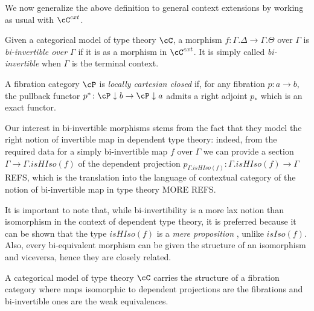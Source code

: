 \documentclass[a4paper,fontsize=12pt]{scrartcl}
\begin{document}
We now generalize the above definition to general context extensions by working
as usual with $\cC^{cxt}$.

\begin{defn}
  Given a categorical model of type theory $\cC$, a morphism
  $f\colon\Gamma.\Delta\rightarrow\Gamma.\Theta$ over $\Gamma$ is
  \emph{bi-invertible over $\Gamma$} if it is as a morphism in $\cC^{cxt}$. It
  is simply called \emph{bi-invertible} when $\Gamma$ is the terminal
  context.
\end{defn}

\begin{defn}
  A fibration category $\cP$ is \emph{locally cartesian closed} if, for any
  fibration $p\colon a\rightarrow b$, the pullback functor
  $p^*\colon\cP\downarrow b\rightarrow\cP\downarrow a$ admits a right adjoint
  $p_*$ which is an exact functor.
\end{defn}

\begin{rmk}
  Our interest in bi-invertible morphisms stems from the fact that they model
  the right notion of invertible map in dependent type theory: indeed, from the
  required data for a simply bi-invertible map $f$ over $\Gamma$ we can provide
  a section $\Gamma\rightarrow\Gamma. isHIso(f)$ of the dependent projection
  $p_{\Gamma.isHIso(f)}\colon\Gamma.isHIso(f)\rightarrow\Gamma$ REFS, which is
  the translation into the language of contextual category of the notion of
  bi-invertible map in type theory MORE REFS.

  It is important to note that, while bi-invertibility is a more lax notion than
  isomorphism in the context of dependent type theory, it is preferred
  because it can be shown that the type $isHIso(f)$ is a \emph{mere
  proposition} , unlike $isIso(f)$. Also, every
  bi-equivalent morphism can be given the structure of an isomorphism and
  viceversa, hence they are closely related.
\end{rmk}

\begin{prop}
  A categorical model of type theory $\cC$ carries the structure of a fibration
  category where maps isomorphic to dependent projections are the fibrations and
  bi-invertible ones are the weak equivalences.
\end{prop}

\end{document}
